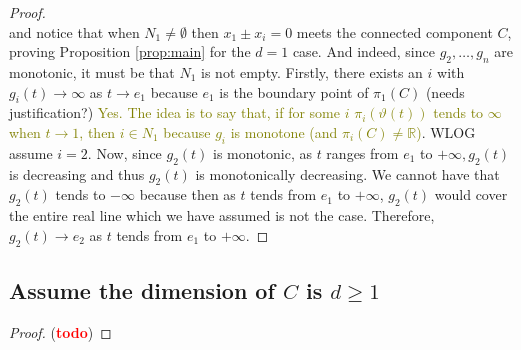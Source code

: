 \documentclass[11pt]{article}
\theoremstyle{definition}
\newtheorem{lemma}{Lemma}
\newcommand{\N}{\mathbb{N}}
\newcommand{\R}{\mathbb{R}}
\newcommand{\vp}{\varphi}
\def\td{(\textcolor{red}{{\bf todo}})}
\def\td{(\textcolor{red}{{\bf todo}}) }
\DeclareMathOperator{\bd}{bd}
\def\ms#1{\textcolor{olive}{#1}}
\begin{document}
\begin{proof}
\[\]
and notice that when $N_1 \not = \emptyset$ then $x_1 \pm x_i=0$ meets the
connected component $C$,
proving Proposition \ref{prop:main} for the $d=1$ case. And indeed, since
$g_2,\hdots,g_n$ are monotonic, it must be that $N_1$ is not empty.
\color{red}Firstly, there exists an $i$ with $g_i(t) \rightarrow \infty$ as $t
\rightarrow e_1$ because $e_1$ is the boundary point of $\pi_1(C)$ (needs
justification?)\color{black} \ms{Yes. The idea is to say that, if for some $i$
  $\pi_i(\vartheta(t))$ tends to $\infty$ when $t\to 1$, then $i\in N_1$ because
  $g_i$ is monotone (and $\pi_i(C)\neq \R$)}. WLOG assume $i=2.$ Now, since
$g_2(t)$ is monotonic, as $t$ ranges from $e_1$ to $+\infty, g_2(t)$ is
decreasing and thus $g_2(t)$ is monotonically decreasing. We cannot have that
$g_2(t)$ tends to $-\infty$ because then as $t$ tends from $e_1$ to $+\infty$,
$g_2(t)$ would cover the entire real line which we have assumed is not the case.
Therefore, $g_2(t) \rightarrow e_2$ as $t$ tends from $e_1$ to $+\infty$.
\end{proof}
%
%




\subsection*{Assume the dimension of $C$ is $d\geq 1$}
\begin{proof}
\td
\end{proof}




\newpage 


\newpage 
\end{document}
